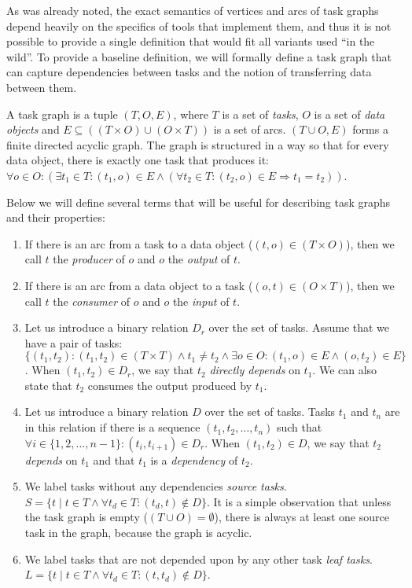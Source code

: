 As was already noted, the exact semantics of vertices and arcs of task graphs depend heavily on the
specifics of tools that implement them, and thus it is not possible to provide a single definition
that would fit all variants used ``in the wild''. To provide a baseline definition, we will
formally define a task graph that can capture dependencies between tasks and the notion of
transferring data between them.

A task graph is a tuple $(T, O, E)$, where $T$ is a set of
\emph{tasks}, $O$ is a set of \emph{data objects} and
$E \subseteq ((T\times{}O) \cup (O\times{}T))$ is a set of arcs. $(T \cup O, E)$ forms a finite directed acyclic
graph. The graph is structured in a way so that for every data object, there is exactly one task
that produces it: $\forall o\in{}O: (\exists t_1\in{}T: (t_1, o) \in E \land
	(\forall
	t_2\in{}T: (t_2, o) \in E \Rightarrow t_1 = t_2))$.

Below we will define several terms that will be useful for describing task graphs and their
properties:
\begin{enumerate}
	\item If there is an arc from a task to a data object ($(t,o) \in (T\times{}O)$), then we call
	      $t$ the \emph{producer} of $o$ and $o$
	      the \emph{output} of $t$.
	\item If there is an arc from a data object to a task ($(o,t) \in (O\times{}T)$), then we call
	      $t$ the \emph{consumer} of $o$ and $o$
	      the \emph{input} of $t$.

	\item Let us introduce a binary relation $D_r$ over the set of tasks. Assume that we
	      have a pair of tasks: $\{(t_1, t_2): (t_1, t_2)\in{}(T\times{}T)\land t_1 \neq t_2 \land
		      \exists{}o\in{}O: (t_1, o)\in{}E
		      \land (o, t_2)\in{}E\}$. When $(t_1, t_2) \in D_r$, we say that
	      $t_2$ \emph{directly depends} on $t_1$. We can also state that
	      $t_2$ consumes the output produced by $t_1$.

	\item Let us introduce a binary relation $D$ over the set of tasks. Tasks
	      $t_1$ and $t_n$ are in this relation if there is a sequence
	      $(t_1, t_2, \ldots, t_n)$ such that $\forall i \in \{
		      1,2,\ldots,n - 1\}: (t_i, t_{i+1}) \in D_r$. When $(t_1, t_2) \in D$, we say that
	      $t_2$ \emph{depends} on $t_1$ and that
	      $t_1$ is a \emph{dependency} of $t_2$.

	\item We label tasks without any dependencies \emph{source tasks}. $S = \{ t \mid t\in{}T \land \forall{}t_d\in{}T:
		      (t_d, t)\notin D\}$. It is a
	      simple observation that unless the task graph is empty ($(T\cup{}O) = \emptyset$), there is always at
	      least one source task in the graph, because the graph is acyclic.
	\item We label tasks that are not depended upon by any other task \emph{leaf tasks}.
	      $L = \{ t \mid t\in{}T \land \forall{}t_d\in{}T: (t,
		      t_d)\notin D\}$.
\end{enumerate}

